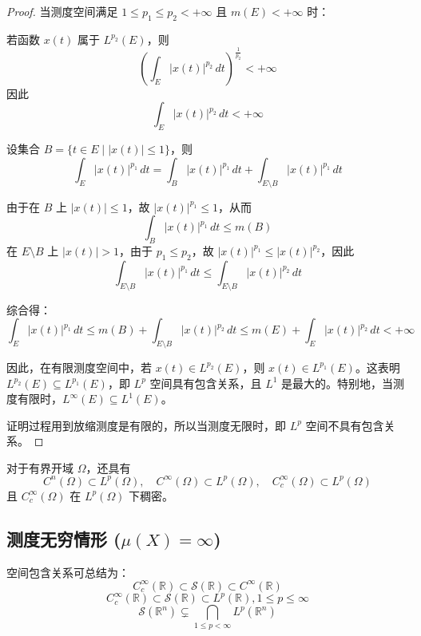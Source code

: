 \documentclass[linespread=1.5,openany]{book}%
\theoremstyle{plain}
\begin{document}
{{{{{{{{										\begin{proof}
											当测度空间满足 $1 \leq p_1 \leq p_2 < +\infty$ 且 $m(E) < +\infty$ 时：
											
											若函数 $x(t)$ 属于 $L^{p_2}(E)$，则
											\[
											\left( \int_E |x(t)|^{p_2} \, dt \right)^{\frac{1}{p_2}} < +\infty
											\]
											因此
											\[
											\int_E |x(t)|^{p_2} \, dt < +\infty
											\]
											
											设集合 $B = \{ t \in E \mid |x(t)| \leq 1 \}$，则
											\[
											\int_E |x(t)|^{p_1} \, dt = \int_B |x(t)|^{p_1} \, dt + \int_{E \setminus B} |x(t)|^{p_1} \, dt
											\]
											
											由于在 $B$ 上 $|x(t)| \leq 1$，故 $|x(t)|^{p_1} \leq 1$，从而
											\[
											\int_B |x(t)|^{p_1} \, dt \leq m(B)
											\]
											在 $E \setminus B$ 上 $|x(t)| > 1$，由于 $p_1 \leq p_2$，故 $|x(t)|^{p_1} \leq |x(t)|^{p_2}$，因此
											\[
											\int_{E \setminus B} |x(t)|^{p_1} \, dt \leq \int_{E \setminus B} |x(t)|^{p_2} \, dt
											\]
											
											综合得：
											\[
											\int_E |x(t)|^{p_1} \, dt \leq m(B) + \int_{E \setminus B} |x(t)|^{p_2} \, dt \leq m(E) + \int_E |x(t)|^{p_2} \, dt < +\infty
											\]
											
											因此，在有限测度空间中，若 $x(t) \in L^{p_2}(E)$，则 $x(t) \in L^{p_1}(E)$。这表明 $L^{p_2}(E) \subseteq L^{p_1}(E)$，即 $L^p$ 空间具有包含关系，且 $L^1$ 是最大的。特别地，当测度有限时，$L^\infty(E) \subseteq L^1(E)$。
											
											证明过程用到放缩测度是有限的，所以当测度无限时，即 $L^p$ 空间不具有包含关系。
											
										\end{proof}
										
										
										
										
										对于有界开域 $\Omega$，还具有
										\[
										C^n(\Omega)\subset L^p(\Omega),\quad
										C^\infty(\Omega)\subset L^p(\Omega),\quad
										C_c^\infty(\Omega)\subset L^p(\Omega)
										\]
										且 $C_c^\infty(\Omega)$ 在 $L^p(\Omega)$ 下稠密。
										
										\subsection{测度无穷情形 ($\mu(X)=\infty$)}
										空间包含关系可总结为：
										\[
										C_c^\infty(\mathbb{R}) \subset \mathcal{S}(\mathbb{R}) \subset C^\infty(\mathbb{R})
										\]
										\[
										C_c^\infty(\mathbb{R}) \subset \mathcal{S}(\mathbb{R}) \subset  L^p(\mathbb{R}) ,1\leq p\le\infty
										\]
										\[ 
										\mathcal{S}(\mathbb{R}^n) \subsetneq \bigcap_{1 \leq p < \infty} L^p(\mathbb{R}^n)
										\]
										
}}}}}}}}
\end{document}
